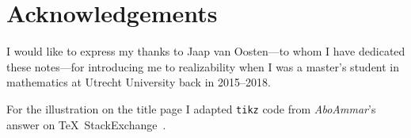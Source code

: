 \chapter{Acknowledgements}

I would like to express my thanks to Jaap van Oosten---to whom I have dedicated these notes---for introducing me to realizability when I was a master's student in
mathematics at Utrecht University back in 2015--2018.

For the illustration on the title page I adapted \verb|tikz| code from
\emph{AboAmmar}'s answer on \TeX\ StackExchange~\cite{latex-triangle}.

